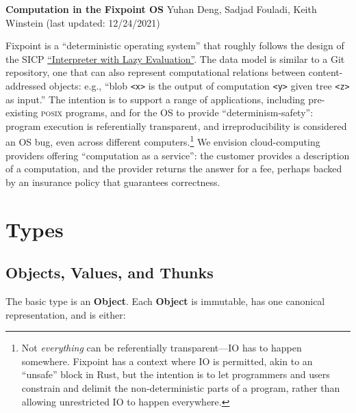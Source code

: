 \documentclass{article}
\newcommand{\valuexs}{\textbf{Value}s\xspace}
\newcommand{\object}{\textbf{Object}\xspace}
\newcommand{\objects}{\textbf{Object}s\xspace}
\newcommand{\thunks}{\textbf{Thunk}s\xspace}
\newcommand{\bs}{\vspace{\baselineskip}}
\begin{document}
\thispagestyle{empty}

\textbf{Computation in the Fixpoint OS}\newline
Yuhan Deng, Sadjad Fouladi, Keith Winstein (last updated: 12/24/2021)

\bs

Fixpoint is a ``deterministic operating system'' that roughly follows
the design of the SICP
\href{https://mitpress.mit.edu/sites/default/files/sicp/full-text/book/book-Z-H-27.html#\%_sec_4.2.2}{``Interpreter
  with Lazy Evaluation''}. The data model is similar to a Git
repository, one that can also represent computational relations
between content-addressed objects: e.g., ``blob \texttt{<x>} is the
output of computation \texttt{<y>} given tree \texttt{<z>} as input.''
The intention is to support a range of applications, including
pre-existing \textsc{posix} programs, and for the OS to provide
``determinism-safety'': program execution is referentially
transparent, and irreproducibility is considered an OS bug, even
across different computers.\footnote{Not \emph{everything} can be
referentially transparent---IO has to happen somewhere. Fixpoint has a
context where IO is permitted, akin to an ``unsafe'' block in Rust,
but the intention is to let programmers and users constrain and
delimit the non-deterministic parts of a program, rather than allowing
unrestricted IO to happen everywhere.} We envision cloud-computing
providers offering ``computation as a service'': the customer provides
a description of a computation, and the provider returns the answer
for a fee, perhaps backed by an insurance policy that guarantees
correctness.


\section{Types}

\subsection{\objects, \valuexs, and \thunks}

The basic type is an \object. Each \object is immutable, has one canonical representation, and is either:
\end{document}
